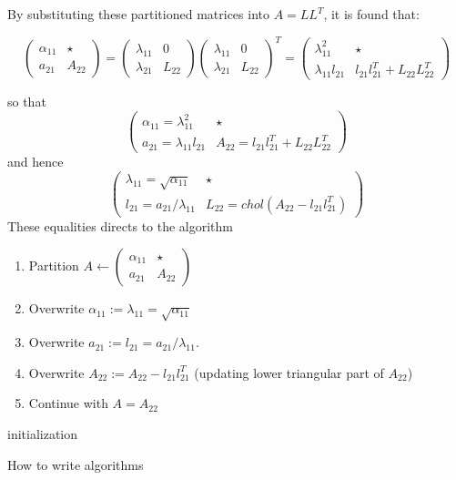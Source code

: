 By substituting these partitioned matrices into $A=LL^T$, it is found that:

\begin{equation*}
\left(
\begin{array}{c|c}
\alpha_{11}  & \star \\ \hline
a_{21} & A_{22}
\end{array}
\right)
=
\left(
\begin{array}{c|c}
\lambda_{11}  & 0 \\ \hline
\lambda_{21} & L_{22}
\end{array}\right)
\left(
\begin{array}{c|c}
\lambda_{11}  & 0 \\ \hline
\lambda_{21} & L_{22}
\end{array}
\right)^T
=
\left(
\begin{array}{c|c}
\lambda_{11}^2  & \star \\ \hline
\lambda_{11}l_{21} & l_{21}l_{21}^T+L_{22}L_{22}^T
\end{array}
\right)
\end{equation*}

so that
\begin{equation*}
	\left(
\begin{array}{c|c}
\alpha_{11}=\lambda_{11}^2  & \star \\ \hline
a_{21} = \lambda_{11}l_{21} & A_{22}=l_{21}l_{21}^T+L_{22}L_{22}^T
\end{array}
\right)
\end{equation*}
and hence
\begin{equation*}
	\left(
\begin{array}{c|c}
\lambda_{11} = \sqrt{\alpha_{11}}  & \star \\ \hline
l_{21} = a_{21}/\lambda_{11} & L_{22} = chol(A_{22}-l_{21}l_{21}^T)
\end{array}
\right)
\end{equation*}
These equalities directs to the algorithm
\begin{enumerate}
	\item Partition $A \gets
	\left(
\begin{array}{c|c}
\alpha_{11}  & \star \\ \hline
a_{21} & A_{22}
\end{array}
\right)$
	\item Overwrite $\alpha_{11}:=\lambda_{11} = \sqrt{\alpha_{11}}$
	\item Overwrite $a_{21} :=l_21 = a_{21}/\lambda_11$.
	\item Overwrite $A_{22}:=A_{22}-l_{21}l_{21}^T$ (updating lower triangular part of $A_22$)
	\item Continue with $A=A_{22}$
\end{enumerate}

\begin{algorithm}[H]
\SetAlgoLined
{}
 initialization\;
 \caption{How to write algorithms}
\end{algorithm}





















